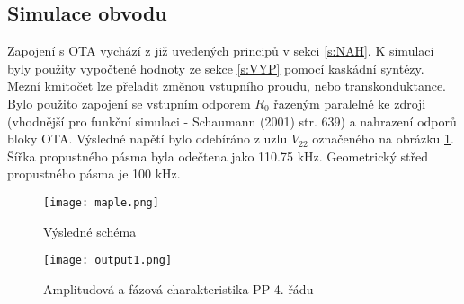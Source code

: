 \subsection{Simulace obvodu}
\noindent  Zapojení s OTA vychází z již uvedených principů v sekci \ref{s:NAH}. K simulaci byly použity vypočtené hodnoty ze sekce \ref{s:VYP} pomocí kaskádní syntézy. Mezní kmitočet lze přeladit změnou vstupního proudu, nebo transkonduktance.
\noindent Bylo použito zapojení se vstupním odporem $R_0$ řazeným paralelně ke zdroji (vhodnější pro funkční simulaci - Schaumann (2001) str. 639) a nahrazení odporů bloky OTA. Výsledné napětí bylo odebíráno z uzlu $V_{22}$ označeného na obrázku \ref{s:V1}. Šířka propustného pásma byla odečtena jako 110.75 kHz. Geometrický střed propustného pásma je 100 kHz.
\begin{figure}[h]
\centering
\texttt{[image: maple.png]}
\caption{Výsledné schéma\label{s:V1}}
\end{figure}
\begin{figure}[h]
\centering
\texttt{[image: output1.png]}
\caption{Amplitudová a fázová charakteristika PP 4. řádu}
\end{figure}
